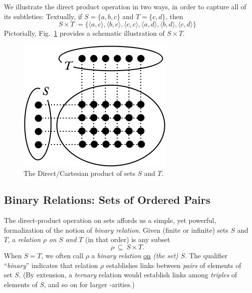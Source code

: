 \smallskip

We illustrate the direct product operation in two ways, in order to capture all of its subtleties: Textually, if $S = \{a,b,c\}$ and $T = \{c,d\}$, then
\[ S \times T \ =  \{
\langle a,c \rangle,
\langle b,c \rangle,
\langle c,c \rangle,
\langle a,d \rangle,
\langle b,d \rangle,
\langle c,d \rangle\}
\]
Pictorially, Fig.~\ref{fig:cartesianproduct} provides a schematic illustration of $S \times T$.
\begin{figure}[htb]
\begin{center}
        \includegraphics[scale=0.4]{FiguresMaths/cartesianProduct}
        \caption{The Direct/Cartesian product of sets $S$ and $T$.}
        \label{fig:cartesianproduct}
\end{center}
\end{figure}

\subsection{Binary Relations: Sets of Ordered Pairs}
\label{sec:relation}

  
The direct-product operation on sets affords us a simple, yet powerful, formalization of the  notion of {\em binary relation}.  Given (finite or infinite) sets $S$ and $T$, a {\it relation $\rho$ on $S$ and $T$} (in that order) is any subset
\[ \rho \ \subseteq \ S \times T. \]
When $S = T$, we often call $\rho$ a {\em binary relation} \underline{on} {\em (the set) $S$}.  The qualifier ``{\em binary}'' indicates that relation $\rho$ establishes links between {\em pairs} of elements of set $S$.  (By extension, a {\em ternary} relation would establish links among {\em triples} of elements of $S$, and so on for larger -arities.) 

\smallskip

